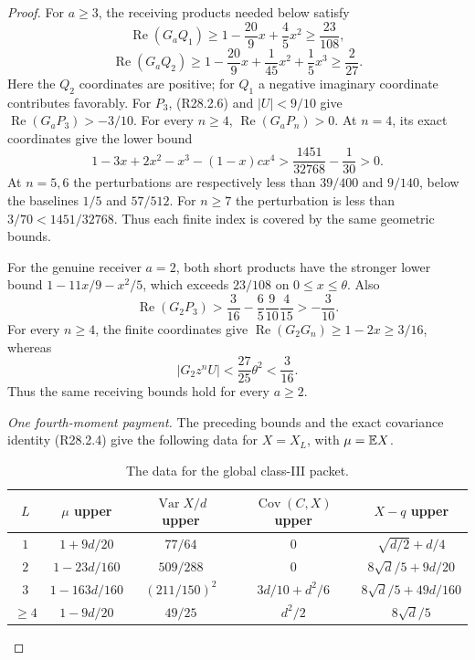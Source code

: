 \begin{proof}
For \(a\ge3\), the receiving products needed below satisfy
\[
 \operatorname{Re}(G_aQ_1)
 \ge1-\frac{20}{9}x+\frac45x^2\ge\frac{23}{108},
\]
\[
 \operatorname{Re}(G_aQ_2)
 \ge1-\frac{20}{9}x+\frac1{45}x^2+\frac15x^3
 \ge\frac2{27}.
\]
Here the \(Q_2\) coordinates are positive; for \(Q_1\) a
negative imaginary coordinate contributes favorably.
For \(P_3\), (R28.2.6) and \(|U|<9/10\) give
\(\operatorname{Re}(G_aP_3)>-3/10\).
For every \(n\ge4\), \(\operatorname{Re}(G_aP_n)>0\).
At \(n=4\), its exact coordinates give the lower bound
\[
 1-3x+2x^2-x^3-(1-x)cx^4
 >\frac{1451}{32768}-\frac1{30}>0.
\]
At \(n=5,6\) the perturbations are respectively less than
\(39/400\) and \(9/140\), below the baselines \(1/5\) and
\(57/512\). For \(n\ge7\) the perturbation is less than
\(3/70<1451/32768\). Thus each finite index is covered by
the same geometric bounds.

For the genuine receiver \(a=2\), both short products have the
stronger lower bound \(1-11x/9-x^2/5\), which exceeds \(23/108\)
on \(0\le x\le\theta\). Also
\[
 \operatorname{Re}(G_2P_3)>
 \frac3{16}-\frac65\frac9{10}\frac4{15}>-\frac3{10}.
\]
For every \(n\ge4\), the finite coordinates give
\(\operatorname{Re}(G_2G_n)\ge1-2x\ge3/16\), whereas
\[
 |G_2z^nU|<\frac{27}{25}\theta^2<\frac3{16}.
\]
Thus the same receiving bounds hold for every \(a\ge2\).

\emph{One fourth-moment payment.}
The preceding bounds and the exact covariance identity (R28.2.4)
give the following data for \(X=X_L\), with \(\mu=\mathbb E X\).
\begin{table}[htbp]\centering\small
\caption{The data for the global class-III packet.}
\label{tab:R28:global-mask-data}
\begin{tabular}{@{}ccccc@{}}
\toprule
\(L\)&\(\mu\) upper&
\(\operatorname{Var}X/d\) upper&
\(\operatorname{Cov}(C,X)\) upper&
\(X-q\) upper\\
\midrule
\(1\)&\(1+9d/20\)&\(77/64\)&\(0\)&
 \(\sqrt{d/2}+d/4\)\\
\(2\)&\(1-23d/160\)&\(509/288\)&\(0\)&
 \(8\sqrt d/5+9d/20\)\\
\(3\)&\(1-163d/160\)&\((211/150)^2\)&
 \(3d/10+d^2/6\)&\(8\sqrt d/5+49d/160\)\\
\(\ge4\)&\(1-9d/20\)&\(49/25\)&
 \(d^2/2\)&\(8\sqrt d/5\)\\
\bottomrule
\end{tabular}
\end{table}


\end{proof}
